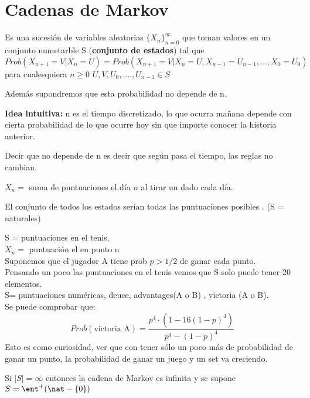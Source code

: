 \section{Cadenas de Markov}

\begin{defn}
	Es una sucesión de variables aleatorias $\{X_n\}_{n=0}^{\infty}$ que toman valores en un conjunto numetarble S (\textbf{conjunto de estados}) tal que 
	$$Prob(X_{n+1} = V | X_n = U) = Prob(X_{n+1} = V | X_n =U , X_{n-1} = U_{n-1} , ... , X_0 = U_0)$$
	para cualesquiera $n \geq 0$ $U,V,U_0,.... ,U_{n-1} \in S$
\end{defn}


\obs Además supondremos que esta probabilidad no depende de n.


\textbf{Idea intuitiva: } n es el tiempo discretizado, lo que ocurra mañana depende con cierta probabilidad de lo que ocurre hoy sin que importe conocer la historia anterior.

Decir que no depende de n es decir que según pasa el tiempo, las reglas no cambian.

\begin{example}
	$X_n =$ suma de puntuaciones el día $n$ al tirar un dado cada día.
	
	El conjunto de todos los estados serían todas las puntuaciones posibles . (S = naturales)
\end{example}

\begin{example}[2]
	S = puntuaciones en el tenis.\\
	$X_n =$ puntuación el en punto n\\
	Suponemos que el jugador A tiene prob $p > 1/2$ de ganar cada punto.\\
	Pensando un poco las puntuaciones en el tenis vemos que S solo puede tener 20 elementos.\\
	S= puntuaciones numéricas, deuce, advantages(A o B) , victoria (A o B).\\
	Se puede comprobar que:
	$$Prob(\text{victoria A}) = \frac{p^4 \cdot(1- 16(1-p)^4)}{p^4 - (1-p)^4}$$
	Esto es como curiosidad, ver que con tener sólo un poco más de probabilidad de ganar un punto, la probabilidad de ganar un juego y un set va creciendo.
\end{example}




Si $|S| = \infty$ entonces la cadena de Markov es infinita y se supone $S = \ent^+ (\nat -\{0\})$


